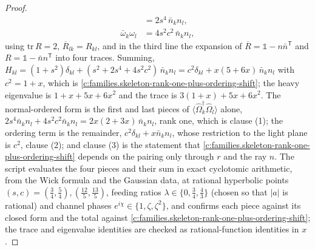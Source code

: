 \documentclass[11pt]{article}
\theoremstyle{definition}
\theoremstyle{plain}
\begin{document}
\begin{proof}
\begin{align*}
&= 2s^{4}\,\bar{n}_{k}n_{l},\\
\bar\omega_{k}\omega_{l} &= 4s^{2}c^{2}\,\bar{n}_{k}n_{l},
\end{align*}
using $\mathrm{tr}\,R = 2$, $\overline{R}_{lk} = R_{kl}$, and in the third line the expansion of $\overline{R} = \mathbb{1} - n\bar{n}^{\mathsf{T}}$ and $R = \mathbb{1} - \bar{n}n^{\mathsf{T}}$ into four traces. Summing, $H_{kl} = (1 + s^{2})\delta_{kl} + (s^{2} + 2s^{4} + 4s^{2}c^{2})\,\bar{n}_{k}n_{l} = c^{2}\delta_{kl} + x(5 + 6x)\,\bar{n}_{k}n_{l}$ with $c^{2} = 1 + x$, which is \ref{c:families.skeleton-rank-one-plus-ordering-shift}; the heavy eigenvalue is $1 + x + 5x + 6x^{2}$ and the trace is $3(1+x) + 5x + 6x^{2}$. The normal-ordered form is the first and last pieces of $\langle\hat\Omega_{k}^{\dagger}\hat\Omega_{l}\rangle$ alone, $2s^{4}\bar{n}_{k}n_{l} + 4s^{2}c^{2}\bar{n}_{k}n_{l} = 2x(2+3x)\,\bar{n}_{k}n_{l}$, rank one, which is clause (1); the ordering term is the remainder, $c^{2}\delta_{kl} + x\bar{n}_{k}n_{l}$, whose restriction to the light plane is $c^{2}$, clause (2); and clause (3) is the statement that \ref{c:families.skeleton-rank-one-plus-ordering-shift} depends on the pairing only through $r$ and the ray $n$. The script evaluates the four pieces and their sum in exact cyclotomic arithmetic, from the Wick formula and the Gaussian data, at rational hyperbolic points $(s, c) = (\tfrac34, \tfrac54), (\tfrac{12}{5}, \tfrac{13}{5})$, feeding ratios $\lambda \in \{0, \tfrac34, \tfrac43\}$ (chosen so that $|a|$ is rational) and channel phases $e^{i\chi} \in \{1, \zeta, \zeta^{2}\}$, and confirms each piece against its closed form and the total against \ref{c:families.skeleton-rank-one-plus-ordering-shift}; the trace and eigenvalue identities are checked as rational-function identities in $x$.

\end{proof}
\end{document}
